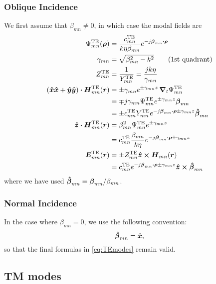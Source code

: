 \subsubsection{Oblique Incidence}
We first assume that $\beta_{mn} \neq 0$, in which case 
the modal fields are
\begin{subequations}
  \label{eq:TEmodes}
  \begin{align}
    \Psi_{mn}^{\text{TE}}(\boldsymbol{\rho}) &= \frac{c_{mn}^{\text{TE}}}{k\eta\beta_{mn}}
    e^{-j\boldsymbol{\beta}_{mn} \boldsymbol{\cdot} \boldsymbol{\rho}} \\
    \gamma_{mn} &= \sqrt{\beta_{mn}^2 - k^2} \qquad \text{(1st quadrant)} \\
    Z_{mn}^{\text{TE}} &= \frac{1}{Y_{mn}^{\text{TE}}} = \frac{jk\eta}{\gamma_{mn}} \\
    (\boldsymbol{\hat{x}}\boldsymbol{\hat{x}}+\boldsymbol{\hat{y}}\boldsymbol{\hat{y}}) \boldsymbol{\cdot} \boldsymbol{H}_{mn}^{\text{TE}}(\boldsymbol{r}) &= \pm \gamma_{mn} e^{\pm\gamma_{mn}z}
    \,\boldsymbol{\nabla}_t \Psi_{mn}^{\text{TE}} \nonumber \label{eq:htransTE} \\
    &= \mp j \gamma_{mn} \Psi_{mn}^{\text{TE}} e^{\pm\gamma_{mn}z}  \boldsymbol{\beta}_{mn}
    \nonumber \\
    &= \pm c_{mn}^{\text{TE}} Y_{mn}^{\text{TE}} e^{-j\boldsymbol{\beta}_{mn}\boldsymbol{\cdot}\boldsymbol{\rho} \pm
      \gamma_{mn} z} \boldsymbol{\hat{\beta}}_{mn}
    \\
    \boldsymbol{\hat{z}} \boldsymbol{\cdot} \boldsymbol{H}_{mn}^{\text{TE}}(\boldsymbol{r}) &= \beta_{mn}^2 \Psi_{mn}^{\text{TE}}
    e^{\pm\gamma_{mn} z} \nonumber  \\
    &= c_{mn}^{\text{TE}} \frac{\beta_{mn}}{k\eta} e^{-j\boldsymbol{\beta}_{mn}\boldsymbol{\cdot}\boldsymbol{\rho} \pm
      \gamma_{mn} z} \\
    \boldsymbol{E}_{mn}^{\text{TE}}(\boldsymbol{r}) &= \pm Z_{mn}^{\text{TE}} \boldsymbol{\hat{z}} \boldsymbol{\times} \boldsymbol{H}_{mn}(\boldsymbol{r}) \nonumber \\
     &= c_{mn}^{\text{TE}}  e^{-j\boldsymbol{\beta}_{mn}\boldsymbol{\cdot}\boldsymbol{\rho} \pm \gamma_{mn} z}
     \boldsymbol{\hat{z}}\boldsymbol{\times}\boldsymbol{\hat{\beta}}_{mn} \label{eq:etransTE}
  \end{align}
\end{subequations}
where we have used  $  \boldsymbol{\hat{\beta}}_{mn} = \boldsymbol{\beta}_{mn} / \beta_{mn}$.




\subsubsection{Normal Incidence}
In the case where $\beta_{mn} = 0$, we use the following convention:
\begin{equation}
  \boldsymbol{\hat{\beta}}_{mn} = \boldsymbol{\hat{x}}, \label{eq:betahatnormal}
\end{equation}
so that the final formulas in \eqref{eq:TEmodes} remain valid.

\subsection{TM modes}
\label{sec:tmmodes}

